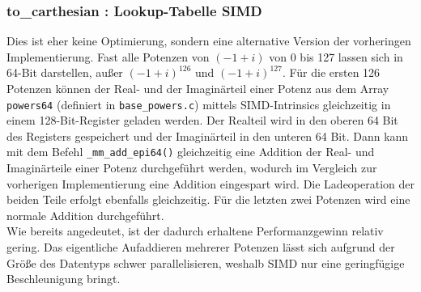 \documentclass[course=erap]{aspdoc}
\begin{document}
\subsubsection{to\_carthesian : Lookup-Tabelle SIMD}
Dies ist eher keine Optimierung, sondern eine alternative Version der vorheringen Implementierung. Fast alle Potenzen von $(-1 + i)$ von 0 bis 127 lassen sich in 64-Bit darstellen, au{\ss}er $(-1 + i) ^ {126}$ und $(-1 + i) ^ {127}$. Für die ersten 126 Potenzen können der Real- und der Imaginärteil einer Potenz aus dem Array \texttt{powers64} (definiert in \texttt{base\_powers.c}) mittels SIMD-Intrinsics gleichzeitig in einem 128-Bit-Register geladen werden. Der Realteil wird in den oberen 64 Bit des Registers gespeichert und der Imaginärteil in den unteren 64 Bit.
Dann kann mit dem Befehl \texttt{\_mm\_add\_epi64()} gleichzeitig eine Addition der Real- und Imagin{\"a}rteile einer Potenz durchgeführt werden, wodurch im Vergleich zur vorherigen Implementierung eine Addition eingespart wird. Die Ladeoperation der beiden Teile erfolgt ebenfalls gleichzeitig. Für die letzten zwei Potenzen wird eine normale Addition durchgeführt.\\
Wie bereits angedeutet, ist der dadurch erhaltene Performanzgewinn relativ gering. Das eigentliche Aufaddieren mehrerer Potenzen lässt sich aufgrund der Größe des Datentyps schwer parallelisieren, weshalb SIMD nur eine geringfügige Beschleunigung bringt.
\end{document}
